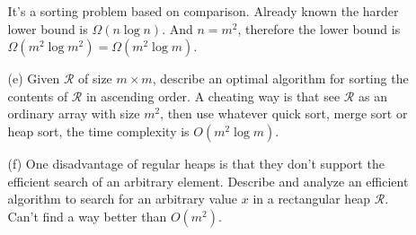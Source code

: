 \documentclass{article}       %
\begin{document}
\begin{enumerate}
\begin{enumerate}
		It's a sorting problem based on comparison. Already known the harder lower bound is $\Omega(n\log n)$. And $n = m^2$, therefore the lower bound is $\Omega(m^2\log m^2) = \Omega(m^2\log m)$.\newline
		\item[(e)] Given $\mathcal{R}$ of size $m\times m$, describe an optimal algorithm for sorting the contents of $\mathcal{R}$ in ascending order.\newline\newline
		A cheating way is that see $\mathcal{R}$ as an ordinary array with size $m^2$, then use whatever quick sort, merge sort or heap sort, the time complexity is $O(m^2\log m)$.\newline
		\item[(f)] One disadvantage of regular heaps is that they don't support the efficient search of an arbitrary element. Describe and analyze an efficient algorithm to search for an arbitrary value $x$ in a rectangular heap  $\mathcal{R}$.\newline\newline
		Can't find a way better than $O(m^2)$.
	\end{enumerate}	
\end{enumerate}
\end{document}

